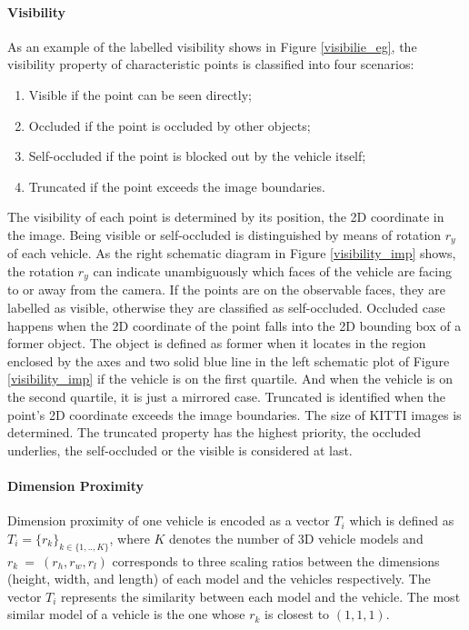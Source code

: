 \documentclass[a4paper,12pt]{article}
\begin{document}
\paragraph{Visibility}
\label{visibility}

As an example of the labelled visibility shows in Figure \ref{visibilie_eg}, the visibility property of characteristic points is classified into four scenarios: 

\begin{enumerate}[\hspace{0.4cm} i.]
	\itemsep-0.5em 
	\item Visible if the point can be seen directly;
	\item Occluded if the point is occluded by other objects;
	\item Self-occluded if the point is blocked out by the vehicle itself;
	\item Truncated if the point exceeds the image boundaries. 
\end{enumerate}


The visibility of each point is determined by its position, \ie the 2D coordinate in the image.  Being visible or self-occluded is distinguished by means of rotation $r_y$ of each vehicle. As the right schematic diagram in Figure \ref{visibility_imp} shows, the rotation $r_y$ can indicate unambiguously which faces of the vehicle are facing to or away from the camera. If the points are on the observable faces, they  are labelled as visible,  otherwise they are classified as self-occluded. Occluded case happens when the 2D coordinate of the point falls into the 2D bounding box of a former object. The object is defined as former when it locates in the region enclosed by the axes and two solid blue line in the left schematic plot of Figure \ref{visibility_imp} if the vehicle is on the first quartile.  And when the vehicle is on the second quartile, it is just a mirrored case. Truncated is identified when the point's 2D coordinate exceeds the image boundaries. The size of KITTI images is determined. The truncated property has the highest priority, the occluded underlies, the self-occluded or the visible is considered at last.


\paragraph{Dimension Proximity}
\label{template}

Dimension proximity of one vehicle is encoded as a vector $\mathit{T_{i}}$ which is defined as $\mathit{T}_i = \{r_k\}_{k \in \{1,.., K\}}$, where $\mathit{K}$ denotes the number of 3D vehicle models and  $r_k~=~(r_h,r_w,r_l)$ corresponds to three scaling ratios between the dimensions (\ie height, width, and length) of each model and the vehicles respectively. The vector $\mathit{T_{i}}$ represents the similarity between each model and the vehicle. The most similar model of a vehicle is the one whose $r_k$ is closest to $(1, 1, 1)$.
\end{document}
